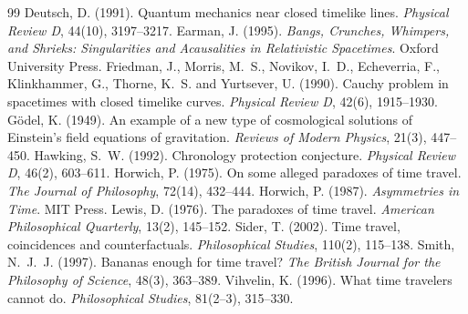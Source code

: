 \documentclass{situationist-preprint}
\begin{document}
\begin{thebibliography}{99}\small
{} Deutsch, D. (1991). Quantum mechanics near closed timelike lines. \emph{Physical Review D}, 44(10), 3197--3217.
 Earman, J. (1995). \emph{Bangs, Crunches, Whimpers, and Shrieks: Singularities and Acausalities in Relativistic Spacetimes}. Oxford University Press.
 Friedman, J., Morris, M.~S., Novikov, I.~D., Echeverria, F., Klinkhammer, G., Thorne, K.~S. and Yurtsever, U. (1990). Cauchy problem in spacetimes with closed timelike curves. \emph{Physical Review D}, 42(6), 1915--1930.
 G\"odel, K. (1949). An example of a new type of cosmological solutions of Einstein's field equations of gravitation. \emph{Reviews of Modern Physics}, 21(3), 447--450.
 Hawking, S.~W. (1992). Chronology protection conjecture. \emph{Physical Review D}, 46(2), 603--611.
 Horwich, P. (1975). On some alleged paradoxes of time travel. \emph{The Journal of Philosophy}, 72(14), 432--444.
 Horwich, P. (1987). \emph{Asymmetries in Time}. MIT Press.
 Lewis, D. (1976). The paradoxes of time travel. \emph{American Philosophical Quarterly}, 13(2), 145--152.
 Sider, T. (2002). Time travel, coincidences and counterfactuals. \emph{Philosophical Studies}, 110(2), 115--138.
 Smith, N.~J.~J. (1997). Bananas enough for time travel? \emph{The British Journal for the Philosophy of Science}, 48(3), 363--389.
 Vihvelin, K. (1996). What time travelers cannot do. \emph{Philosophical Studies}, 81(2--3), 315--330.
\end{thebibliography}
\end{document}
